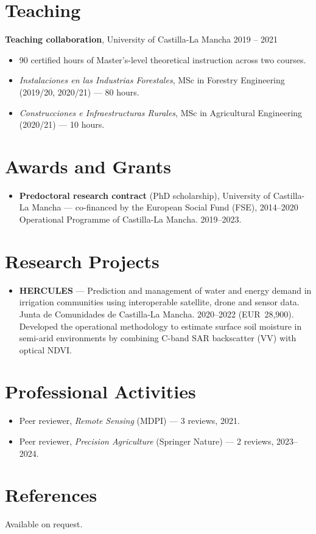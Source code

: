 \documentclass[10pt, a4paper]{article}
\newenvironment{highlights}{
    \begin{itemize}[
        topsep=0.10cm,
        parsep=0.10cm,
        partopsep=0pt,
        itemsep=0pt,
        leftmargin=0cm + 10pt
    ]
}{
    \end{itemize}
}
\begin{document}
\section{Teaching}

\textbf{Teaching collaboration}, University of Castilla-La Mancha \hfill 2019 -- 2021

\vspace{0.10cm}
\begin{highlights}
    \item 90 certified hours of Master's-level theoretical instruction across two courses.
    \item \emph{Instalaciones en las Industrias Forestales}, MSc in Forestry Engineering (2019/20, 2020/21) --- 80 hours.
    \item \emph{Construcciones e Infraestructuras Rurales}, MSc in Agricultural Engineering (2020/21) --- 10 hours.
\end{highlights}

\section{Awards and Grants}

\begin{highlights}
    \item \textbf{Predoctoral research contract} (PhD scholarship), University of Castilla-La Mancha --- co-financed by the European Social Fund (FSE), 2014--2020 Operational Programme of Castilla-La Mancha. 2019--2023.
\end{highlights}

\section{Research Projects}

\begin{highlights}
    \item \textbf{HERCULES} --- Prediction and management of water and energy demand in irrigation communities using interoperable satellite, drone and sensor data. Junta de Comunidades de Castilla-La Mancha. 2020--2022 (EUR~28,900). Developed the operational methodology to estimate surface soil moisture in semi-arid environments by combining C-band SAR backscatter (VV) with optical NDVI.
\end{highlights}

\section{Professional Activities}

\begin{highlights}
    \item Peer reviewer, \emph{Remote Sensing} (MDPI) --- 3 reviews, 2021.
    \item Peer reviewer, \emph{Precision Agriculture} (Springer Nature) --- 2 reviews, 2023--2024.
\end{highlights}

\section{References}

Available on request.
\end{document}
